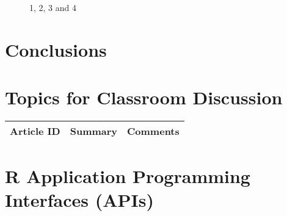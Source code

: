 \begin{figure}[H]
	\centering
	\begin{minipage}[b]{0.5\linewidth}
	\end{minipage}\hfill
	\begin{minipage}[b]{0.5\linewidth}
	\end{minipage}\hfill	
	\begin{minipage}[b]{0.5\linewidth}
	\end{minipage}\hfill
	\begin{minipage}[b]{0.5\linewidth}
	\end{minipage}\hfill
	\caption{1, 2, 3 and 4}
	\label{fig:Figure1}
\end{figure} 


\section{Conclusions}

\begin{enumerate}
\end{enumerate}


\section{Topics for Classroom Discussion}

\begin{table}[H]\centering
	\begin{tabular}{p{1cm}p{4cm}p{3cm}}
		Article ID & Summary & Comments\\
		\hline
		\hline
	\end{tabular}
\end{table}



\section{R Application Programming Interfaces (APIs)}




